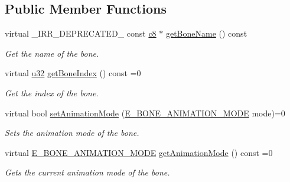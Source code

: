 \subsection*{Public Member Functions}
\begin{DoxyCompactItemize}
\item 
virtual \+\_\+\+I\+R\+R\+\_\+\+D\+E\+P\+R\+E\+C\+A\+T\+E\+D\+\_\+ const \hyperlink{namespaceirr_a9395eaea339bcb546b319e9c96bf7410}{c8} $\ast$ \hyperlink{classirr_1_1scene_1_1IBoneSceneNode_a1c40bee44b89fe81178782e999cbe3a8}{get\+Bone\+Name} () const
\begin{DoxyCompactList}\small\item\em Get the name of the bone. \end{DoxyCompactList}\item 
\mbox{\label{classirr_1_1scene_1_1IBoneSceneNode_ac372b2c84a3427df1fdc78deae7d00ea}} 
virtual \hyperlink{namespaceirr_a0416a53257075833e7002efd0a18e804}{u32} \hyperlink{classirr_1_1scene_1_1IBoneSceneNode_ac372b2c84a3427df1fdc78deae7d00ea}{get\+Bone\+Index} () const =0
\begin{DoxyCompactList}\small\item\em Get the index of the bone. \end{DoxyCompactList}\item 
virtual bool \hyperlink{classirr_1_1scene_1_1IBoneSceneNode_a424a467f045e809bcad2aa239edb9994}{set\+Animation\+Mode} (\hyperlink{namespaceirr_1_1scene_a318162c0a3aad1cf228ed7daddd44801}{E\+\_\+\+B\+O\+N\+E\+\_\+\+A\+N\+I\+M\+A\+T\+I\+O\+N\+\_\+\+M\+O\+DE} mode)=0
\begin{DoxyCompactList}\small\item\em Sets the animation mode of the bone. \end{DoxyCompactList}\item 
\mbox{\label{classirr_1_1scene_1_1IBoneSceneNode_a332e040471057cf6a1a0ae8dfa2c0f5f}} 
virtual \hyperlink{namespaceirr_1_1scene_a318162c0a3aad1cf228ed7daddd44801}{E\+\_\+\+B\+O\+N\+E\+\_\+\+A\+N\+I\+M\+A\+T\+I\+O\+N\+\_\+\+M\+O\+DE} \hyperlink{classirr_1_1scene_1_1IBoneSceneNode_a332e040471057cf6a1a0ae8dfa2c0f5f}{get\+Animation\+Mode} () const =0
\begin{DoxyCompactList}\small\item\em Gets the current animation mode of the bone. \end{DoxyCompactList}\item 

\end{DoxyCompactItemize}
